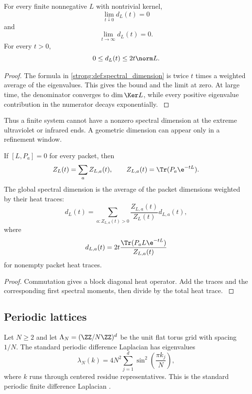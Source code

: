 \begin{proposition}\label{strong:proposition:009}\label{strong:prop:finite_spectral_limits}
For every finite nonnegative \(L\) with nontrivial kernel,
\[
\lim_{t\downarrow0}d_L(t)=0
\]
and
\[
\lim_{t\to\infty}d_L(t)=0.
\]
For every \(t>0\),
\[
0\leq d_L(t)\leq2t\norm L.
\]
\end{proposition}

\begin{proof}\label{strong:proof:062}
The formula in \cref{strong:def:spectral_dimension} is twice \(t\) times a weighted average of the eigenvalues. This gives the bound and the limit at zero. At large time, the denominator converges to \(\dim\Ker L\), while every positive eigenvalue contribution in the numerator decays exponentially.
\label{strong:proof:062:end}\end{proof}

Thus a finite system cannot have a nonzero spectral dimension at the extreme ultraviolet or infrared ends. A geometric dimension can appear only in a refinement window.

\begin{proposition}\label{strong:proposition:010}\label{strong:prop:heat_packets}
If \([L,P_a]=0\) for every packet, then
\[
Z_L(t)=\sum_aZ_{L,a}(t),
\qquad
Z_{L,a}(t)=\Tr(P_a\e^{-tL}).
\]
The global spectral dimension is the average of the packet dimensions weighted by their heat traces:
\[
d_L(t)
=
\sum_{a:Z_{L,a}(t)>0}
\frac{Z_{L,a}(t)}{Z_L(t)}
 d_{L,a}(t),
\]
where
\[
d_{L,a}(t)
=2t
\frac{\Tr(P_aL\e^{-tL})}{Z_{L,a}(t)}
\]
for nonempty packet heat traces.
\end{proposition}

\begin{proof}\label{strong:proof:063}
Commutation gives a block diagonal heat operator. Add the traces and the corresponding first spectral moments, then divide by the total heat trace.
\label{strong:proof:063:end}\end{proof}

\subsection{Periodic lattices}\label{strong:subsec:periodic_lattices}

Let \(N\geq2\) and let \(\Lambda_N=(\ZZ/N\ZZ)^d\) be the unit flat torus grid with spacing \(1/N\). The standard periodic difference Laplacian has eigenvalues
\[
\lambda_N(k)
=
4N^2
\sum_{j=1}^{d}
\sin^2\left(\frac{\pi k_j}{N}\right),
\]
where \(k\) runs through centered residue representatives. This is the standard periodic finite difference Laplacian \cite{Strikwerda2004}.

